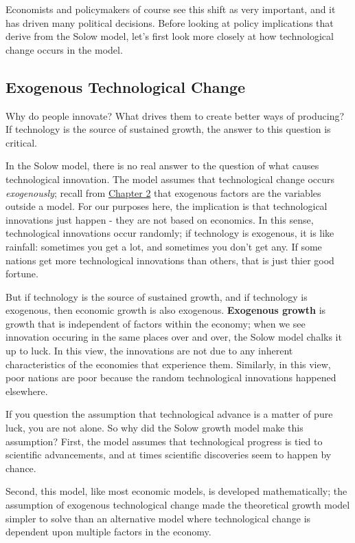 \documentclass[11pt]{article} %
\begin{document}
Economists and policymakers of course see this shift as very important, and it has driven many political decisions. Before looking at policy implications that derive from the Solow model, let's first look more closely at how technological change occurs in the model.

\subsection*{Exogenous Technological Change}
Why do people innovate? What drives them to create better ways of producing? If technology is the source of sustained growth, the answer to this question is critical.

In the Solow model, there is no real answer to the question of what causes technological innovation. The model assumes that technological change occurs \textit{exogenously}; recall from \underline{Chapter 2} that exogenous factors are the variables outside a model. For our purposes here, the implication is that technological innovations just happen - they are not based on economics. In this sense, technological innovations occur randomly; if technology is exogenous, it is like rainfall: sometimes you get a lot, and sometimes you don't get any. If some nations get more technological innovations than others, that is just thier good fortune.

But if technology is the source of sustained growth, and if technology is exogenous, then economic growth is also exogenous. \textbf{Exogenous growth} is growth that is independent of factors within the economy; when we see innovation occuring in the same places over and over, the Solow model chalks it up to luck. In this view, the innovations are not due to any inherent characteristics of the economies that experience them. Similarly, in this view, poor nations are poor because the random technological innovations happened elsewhere.

If you question the assumption that technological advance is a matter of pure luck, you are not alone. So why did the Solow growth model make this assumption? First, the model assumes that technological progress is tied to scientific advancements, and at times scientific discoveries seem to happen by chance.

Second, this model, like most economic models, is developed mathematically; the assumption of exogenous technological change made the theoretical growth model simpler to solve than an alternative model where technological change is dependent upon multiple factors in the economy.
\end{document}
